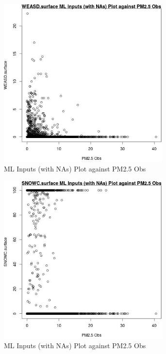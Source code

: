 \begin{figure} 
\centering  
\includegraphics[width=0.77\textwidth]{Code_Outputs/Report_ML_input_PM25_Step4_part_e_de_duplicated_aveswNAs_WEASDsurfacevPM25_Obs.jpg} 
\caption{\label{fig:Report_ML_input_PM25_Step4_part_e_de_duplicated_aveswNAsWEASDsurfacevPM25_Obs}ML Inputs (with NAs) Plot against PM2.5 Obs} 
\end{figure} 
 

\begin{figure} 
\centering  
\includegraphics[width=0.77\textwidth]{Code_Outputs/Report_ML_input_PM25_Step4_part_e_de_duplicated_aveswNAs_SNOWCsurfacevPM25_Obs.jpg} 
\caption{\label{fig:Report_ML_input_PM25_Step4_part_e_de_duplicated_aveswNAsSNOWCsurfacevPM25_Obs}ML Inputs (with NAs) Plot against PM2.5 Obs} 
\end{figure} 
 

